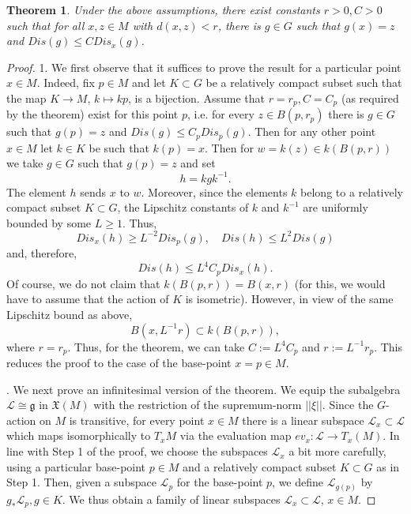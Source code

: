 \documentclass[12pt]{amsbook}%
\newtheorem{thm}{Theorem}[chapter]
\theoremstyle{definition}
\theoremstyle{remark}
\numberwithin{section}{chapter}
\numberwithin{subsection}{section}
\numberwithin{figure}{chapter}
\def\cL{{\mathscr{L}}}
\begin{document}
{{\begin{thm}\label{thm:displacements}
Under the above assumptions,  there exist constants $r > 0, C >0$ such that for all $x, z\in M$ with $d(x,z)<r$, there is 
$g\in G$ such that $g(x)=z$ and $Dis(g)\leqslant C Dis_x(g)$. 
\end{thm}
\begin{proof} 1. We first observe that it suffices to prove the result for a particular point $x\in M$. Indeed, fix $p\in M$ and let $K\subset G$ 
be a relatively compact subset such that the map $K\to M$, $k\mapsto kp$, is a bijection.
Assume that $r=r_p, C=C_p$ (as required by the theorem) exist for this point $p$, i.e. for every $z\in B(p,r_p)$ there is $g\in G$ such that 
$g(p)=z$ and $ Dis(g)\leqslant C_p Dis_p(g)$. Then for any other point $x\in M$ let $k\in K$ be such that $k(p)=x$. Then for $w=k(z)\in k(B(p,r))$ we take 
$g\in G$ such that $g(p)=z$ and set
$$
h= k g k^{-1}.
$$
The element $h$ sends $x$ to $w$. Moreover, since the elements $k$ belong to a relatively compact subset $K\subset G$, the Lipschitz constants of $k$ and $k^{-1}$ 
are uniformly bounded by some $L\geqslant 1$. Thus,
$$
Dis_x(h)\geqslant L^{-2} Dis_p(g), \quad Dis(h)\leqslant L^2 Dis(g)
$$
and, therefore,
$$
Dis(h) \leqslant L^{4}C_p Dis_x(h). 
$$
Of course, we do not claim that $k(B(p,r))= B(x,r)$ (for this, we would have to assume that the action of $K$ is isometric). However, in view of the same 
Lipschitz bound as above,
$$
B(x, L^{-1}r)\subset k(B(p,r)),
$$
where $r=r_p$. Thus, for the theorem, we can take $C:= L^{4}C_p$ and $r:=L^{-1}r_p$. This reduces the proof to the case of the base-point $x=p\in M$. 


. We next prove an infinitesimal version of the theorem. 
We equip the subalgebra $\cL\cong {\mathfrak g}$ in ${\mathfrak X}(M)$ with the restriction of the supremum-norm $||\xi||$. 
Since the $G$-action on $M$ is transitive, for every point $x\in M$ there is a linear subspace  $\cL_x\subset \cL$ 
which maps isomorphically  to $T_xM$ via the evaluation map $ev_x: \cL\to T_x(M)$. In line with Step 1 of the proof, we choose the subspaces $\cL_x$ a bit 
more carefully, using a particular base-point $p\in M$ and a relatively compact subset $K\subset G$ as in Step 1. Then, given 
a subspace $\cL_p$ for the base-point $p$, we define $\cL_{g(p)}$ by $g_* \cL_p, g\in K$. We thus obtain a family of linear subspaces 
$\cL_x\subset \cL$, $x\in M$. 



\end{proof}}}
\end{document}

